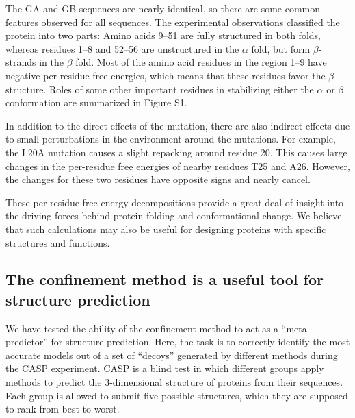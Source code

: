 \documentclass[12pt]{article}
\begin{document}
The GA and GB sequences are nearly identical, so there are some common features observed for all sequences.
The experimental observations classified the protein into two parts: Amino acids 9--51 are fully structured in both
folds, whereas residues 1--8 and 52--56 are unstructured in the $\alpha$ fold, but form $\beta$-strands in the $\beta$
fold. Most of the amino acid residues in the region 1--9 have negative per-residue free energies, which means that these
residues favor the $\beta$ structure. Roles of some other important residues in stabilizing either the $\alpha$ or
$\beta$ conformation are summarized in Figure S1.

In addition to the direct effects of the mutation, there are also indirect effects due to small perturbations in the
environment around the mutations. For example, the L20A mutation causes a slight repacking around residue 20. This
causes large changes in the per-residue free energies of nearby residues T25 and A26. However, the changes for these two
residues have opposite signs and nearly cancel.

These per-residue free energy decompositions provide a great deal of insight into the driving forces behind protein
folding and conformational change. We believe that such calculations may also be useful for designing proteins with
specific structures and functions.

\subsection*{The confinement method is a useful tool for structure prediction}

We have tested the ability of the confinement method to act as a ``meta-predictor'' for structure prediction. Here, the
task is to correctly identify the most accurate models out of a set of ``decoys'' generated by different methods during
the CASP experiment. CASP is a blind test in which different groups apply methods to predict the 3-dimensional structure
of proteins from their sequences. Each group is allowed to submit five possible structures, which they are supposed to
rank from best to worst.
\end{document}
